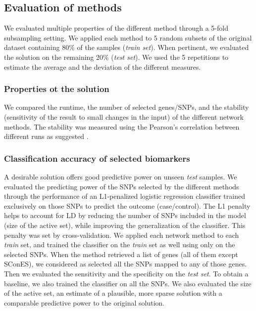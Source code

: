\documentclass[twocolumn, 11pt, draft]{article}
\begin{document}
\subsection{Evaluation of methods}

We evaluated multiple properties of the different method through a 5-fold subsampling setting. We applied each method to 5 random subsets of the original dataset containing 80\% of the samples (\emph{train set}). When pertinent, we evaluated the solution on the remaining 20\% (\emph{test set}). We used the 5 repetitions to estimate the average and the deviation of the different measures.

\subsubsection{Properties ot the solution}
\label{methods:comparison}

We compared the runtime, the number of selected genes/SNPs, and the stability (sensitivity of the result to small changes in the input) of the different network methods. The stability was measured using the Pearson's correlation between different runs as suggested \citet{nogueira_measuring_2016}.

\subsubsection{Classification accuracy of selected biomarkers}
\label{methods:classifier}

A desirable solution offers good predictive power on unseen \emph{test} samples. We evaluated the predicting power of the SNPs selected by the different methods through the performance of an L1-penalized logistic regression classifier trained exclusively on those SNPs to predict the outcome (case/control). The L1 penalty helps to account for LD by reducing the number of SNPs included in the model (size of the active set), while improving the generalization of the classifier. This penalty was set by cross-validation. We applied each network method to each \emph{train} set, and trained the classifier on the \emph{train} set as well using only on the selected SNPs. When the method retrieved a list of genes (all of them except SConES), we considered as selected all the SNPs mapped to any of those genes. Then we evaluated the sensitivity and the specificity on the \emph{test set}. To obtain a baseline, we also trained the classifier on all the SNPs. We also evaluated the size of the active set, an estimate of a plausible, more sparse solution with a comparable predictive power to the original solution.
\end{document}
